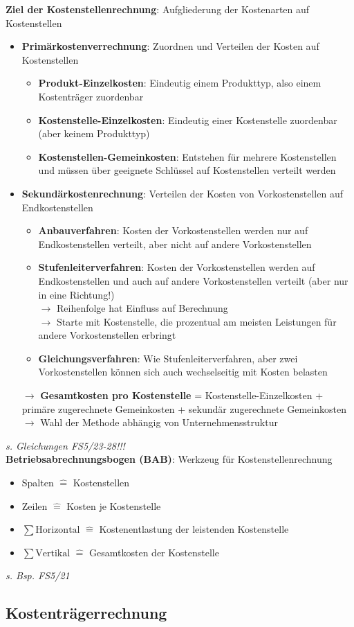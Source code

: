 \textbf{Ziel der Kostenstellenrechnung}: Aufgliederung der Kostenarten auf Kostenstellen
\begin{itemize}
	\item \textbf{Primärkostenverrechnung}: Zuordnen und Verteilen der Kosten auf Kostenstellen
	\begin{itemize}
		\item \textbf{Produkt-Einzelkosten}: Eindeutig einem Produkttyp, also einem Kostenträger zuordenbar
		\item \textbf{Kostenstelle-Einzelkosten}: Eindeutig einer Kostenstelle zuordenbar (aber keinem Produkttyp)
		\item \textbf{Kostenstellen-Gemeinkosten}: Entstehen für mehrere Kostenstellen und müssen über geeignete Schlüssel auf Kostenstellen verteilt werden
	\end{itemize}
	\item \textbf{Sekundärkostenrechnung}: Verteilen der Kosten von Vorkostenstellen auf Endkostenstellen
	\begin{itemize}
		\item \textbf{Anbauverfahren}: Kosten der Vorkostenstellen werden nur auf Endkostenstellen verteilt, aber nicht auf andere Vorkostenstellen
		\item \textbf{Stufenleiterverfahren}: Kosten der Vorkostenstellen werden auf Endkostenstellen und auch auf andere Vorkostenstellen verteilt (aber nur in eine Richtung!)\\
		$\rightarrow$ Reihenfolge hat Einfluss auf Berechnung\\
		$\rightarrow$ Starte mit Kostenstelle, die prozentual am meisten Leistungen für andere Vorkostenstellen erbringt
		\item \textbf{Gleichungsverfahren}: Wie Stufenleiterverfahren, aber zwei Vorkostenstellen können sich auch wechselseitig mit Kosten belasten
	\end{itemize}
	$\rightarrow$ \textbf{Gesamtkosten pro Kostenstelle} = Kostenstelle-Einzelkosten + primäre zugerechnete Gemeinkosten + sekundär zugerechnete Gemeinkosten\\
	$\rightarrow$ Wahl der Methode abhängig von Unternehmensstruktur
\end{itemize}
\textit{s. Gleichungen FS5/23-28!!!}\\

\textbf{Betriebsabrechnungsbogen (BAB)}: Werkzeug für Kostenstellenrechnung
\begin{itemize}
	\item Spalten $\widehat{=}$ Kostenstellen
	\item Zeilen $\widehat{=}$ Kosten je Kostenstelle
	\item $\sum\text{Horizontal }\widehat{=}$ Kostenentlastung der leistenden Kostenstelle
	\item $\sum\text{Vertikal }\widehat{=}$ Gesamtkosten der Kostenstelle
\end{itemize}
\textit{s. Bsp. FS5/21}

\subsection{Kostenträgerrechnung}
